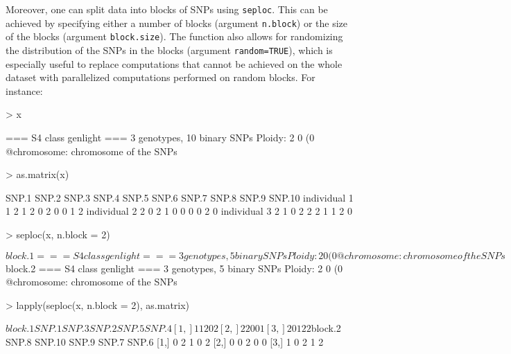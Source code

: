 \documentclass{article}
\begin{document}
Moreover, one can split data into blocks of SNPs using \texttt{seploc}.
This can be achieved by specifying either a number of blocks (argument \texttt{n.block}) or the size
of the blocks (argument \texttt{block.size}). The function also allows for randomizing the
distribution of the SNPs in the blocks (argument \texttt{random=TRUE}), which is especially useful
to replace computations that cannot be achieved on the whole dataset with parallelized computations performed on random blocks.
For instance:
\begin{Schunk}
\begin{Sinput}
> x
\end{Sinput}
\begin{Soutput}
 === S4 class genlight ===
 3 genotypes,  10 binary SNPs
 Ploidy: 2
 0 (0 %) missing data
 @chromosome: chromosome of the SNPs
\end{Soutput}
\begin{Sinput}
> as.matrix(x)
\end{Sinput}
\begin{Soutput}
             SNP.1 SNP.2 SNP.3 SNP.4 SNP.5 SNP.6 SNP.7 SNP.8 SNP.9 SNP.10
individual 1     1     2     1     2     0     2     0     0     1      2
individual 2     2     0     2     1     0     0     0     0     2      0
individual 3     2     1     0     2     2     2     1     1     2      0
\end{Soutput}
\begin{Sinput}
> seploc(x, n.block = 2)
\end{Sinput}
\begin{Soutput}
$block.1
 === S4 class genlight ===
 3 genotypes,  5 binary SNPs
 Ploidy: 2
 0 (0 %) missing data
 @chromosome: chromosome of the SNPs

$block.2
 === S4 class genlight ===
 3 genotypes,  5 binary SNPs
 Ploidy: 2
 0 (0 %) missing data
 @chromosome: chromosome of the SNPs
\end{Soutput}
\begin{Sinput}
> lapply(seploc(x, n.block = 2), as.matrix)
\end{Sinput}
\begin{Soutput}
$block.1
     SNP.1 SNP.3 SNP.2 SNP.5 SNP.4
[1,]     1     1     2     0     2
[2,]     2     2     0     0     1
[3,]     2     0     1     2     2

$block.2
     SNP.8 SNP.10 SNP.9 SNP.7 SNP.6
[1,]     0      2     1     0     2
[2,]     0      0     2     0     0
[3,]     1      0     2     1     2
\end{Soutput}
\end{Schunk}
\end{document}

